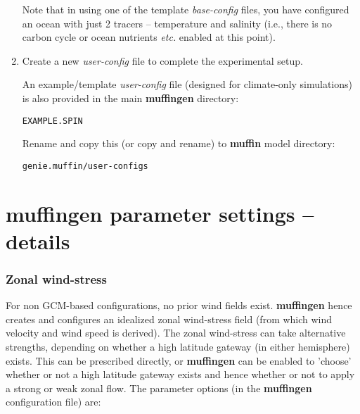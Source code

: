 \documentclass[11pt,fleqn]{book} %
\begin{document}
\begin{enumerate}
\noindent Note that in using one of the template \textit{base-config} files, you have configured an ocean with just 2 tracers -- temperature and salinity (i.e., there is no carbon cycle or ocean nutrients \textit{etc.} enabled at this point).

\vspace{1mm}
\item Create a new \textit{user-config} file to complete the experimental setup.

\noindent An example/template \textit{user-config} file (designed for climate-only simulations) is also provided in the main \textbf{muffingen} directory:

\vspace{1mm}
\texttt{EXAMPLE.SPIN}

\vspace{1mm}

Rename and copy this (or copy and rename) to \textbf{muffin} model directory:

\vspace{1mm}
\texttt{genie.muffin/user-configs}
\vspace{1mm}

\end{enumerate}
\vspace{2mm}


\newpage

\section{muffingen parameter settings -- details}


\subsubsection{Zonal wind-stress}

For non GCM-based configurations, no prior wind fields exist. \textbf{muffingen} hence creates and configures an idealized zonal wind-stress field (from which wind velocity and wind speed is derived). The zonal wind-stress can take alternative strengths, depending on whether a high latitude gateway (in either hemisphere) exists. This can be prescribed directly, or \textbf{muffingen} can be enabled to 'choose' whether or not a high latitude gateway exists and hence whether or not to apply a strong or weak zonal flow. The parameter options (in the \textbf{muffingen} configuration file) are:
\end{document}
